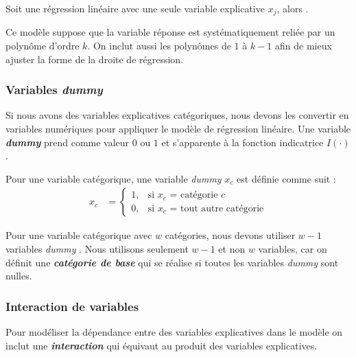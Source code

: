 \documentclass[french]{article}
\begin{document}
\begin{multicols*}{2}
\begin{definitionNOHFILLsub}
Soit une régression linéaire avec une seule variable explicative $x_{j}$, alors . 

\bigskip

Ce modèle suppose que la variable réponse est systématiquement reliée par un polynôme d'ordre $k$. On inclut aussi les polynômes de $1$ à $k - 1$ afin de mieux ajuster la forme de la droite de régression.
\end{definitionNOHFILLsub}



\subsubsection{Variables \og \textit{dummy} \fg{}}
\begin{rappel_enhanced}[Contexte]
Si nous avons des variables explicatives catégoriques, nous devons les convertir en variables numériques pour appliquer le modèle de régression linéaire. Une variable \og \textit{\textbf{dummy}} \fg{} prend comme valeur $0$ ou $1$ et s'apparente à la fonction indicatrice $I(\cdot)$.
\end{rappel_enhanced}

\begin{definitionNOHFILL}
Pour une variable catégorique, une variable \og \textit{dummy} \fg{} $x_{c}$ est définie comme suit :
\begin{align*}
	x_{c}
	&=	\begin{cases}
		1,	&	\text{si $x_{c}$ = catégorie $c$}	\\
		0,	&	\text{si $x_{c}$ = tout autre catégorie}
		\end{cases}
\end{align*}

\bigskip

Pour une variable catégorique avec $w$ catégories, nous devons utiliser $w - 1$ variables \og \textit{dummy} \fg{}. Nous utilisons seulement $w -  1$ et non $w$ variables, car on définit une \textbf{\textit{catégorie de base}} qui se réalise si toutes les variables \og \textit{dummy} \fg{} sont nulles.
\end{definitionNOHFILL}



\subsubsection{Interaction de variables}
\begin{rappel_enhanced}[Contexte]
Pour modéliser la dépendance entre des variables explicatives dans le modèle on inclut une \textbf{\textit{interaction}} qui équivaut au produit des variables explicatives. 
\end{rappel_enhanced}


\end{multicols*}
\end{document}

